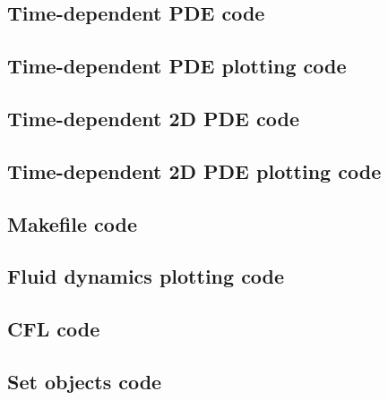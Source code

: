 \documentclass[twocolumn]{myarticle}
\numberwithin{equation}{section}
\begin{document}

\vspace{10pt}

\subsection{Time-dependent PDE code}
\label{subsec:time_dependent_pde_code}


\vspace{10pt}

\subsection{Time-dependent PDE plotting code}
\label{subsec:time_dependent_pde_plotting_code}


\vspace{10pt}

\subsection{Time-dependent 2D PDE code}
\label{subsec:time_dependent_2d_pde_code}


\vspace{10pt}

\subsection{Time-dependent 2D PDE plotting code}
\label{subsec:time_dependent_2d_pde_plotting_code}


\vspace{10pt}

\subsection{Makefile code}
\label{subsec:makefile_code}


\vspace{10pt}

\subsection{Fluid dynamics plotting code}
\label{subsec:fluid_dynamics_plotting_code}


\vspace{10pt}

\subsection{CFL code}
\label{subsec:cfl_code}


\vspace{10pt}

\subsection{Set objects code}
\label{subsec:set_objects_code}


\vspace{10pt}
\end{document}

